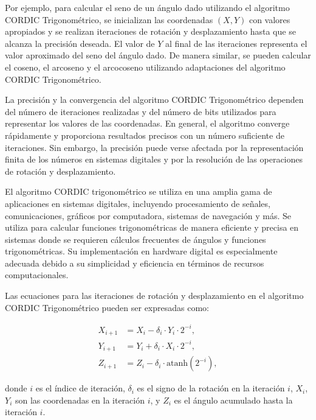 \documentclass[12pt,a4paper, twoside]{article} %
\begin{document}
Por ejemplo, para calcular el seno de un ángulo dado utilizando el algoritmo CORDIC Trigonométrico, se inicializan las coordenadas $(X, Y)$ con valores apropiados y se realizan iteraciones de rotación y desplazamiento hasta que se alcanza la precisión deseada. El valor de $Y$ al final de las iteraciones representa el valor aproximado del seno del ángulo dado. De manera similar, se pueden calcular el coseno, el arcoseno y el arcocoseno utilizando adaptaciones del algoritmo CORDIC Trigonométrico.



La precisión y la convergencia del algoritmo CORDIC Trigonométrico dependen del número de iteraciones realizadas y del número de bits utilizados para representar los valores de las coordenadas. En general, el algoritmo converge rápidamente y proporciona resultados precisos con un número suficiente de iteraciones. Sin embargo, la precisión puede verse afectada por la representación finita de los números en sistemas digitales y por la resolución de las operaciones de rotación y desplazamiento.

El algoritmo CORDIC trigonométrico se utiliza en una amplia gama de aplicaciones en sistemas digitales, incluyendo procesamiento de señales, comunicaciones, gráficos por computadora, sistemas de navegación y más. Se utiliza para calcular funciones trigonométricas de manera eficiente y precisa en sistemas donde se requieren cálculos frecuentes de ángulos y funciones trigonométricas. Su implementación en hardware digital es especialmente adecuada debido a su simplicidad y eficiencia en términos de recursos computacionales.

Las ecuaciones para las iteraciones de rotación y desplazamiento en el algoritmo CORDIC Trigonométrico pueden ser expresadas como:

\begin{equation}
    \begin{aligned}
        X_{i+1} &= X_i - \delta_i \cdot Y_i \cdot 2^{-i}, \\
        Y_{i+1} &= Y_i + \delta_i \cdot X_i \cdot 2^{-i}, \\
        Z_{i+1} &= Z_i - \delta_i \cdot \text{atanh}(2^{-i}),
    \end{aligned}
\end{equation}

donde $i$ es el índice de iteración, $\delta_i$ es el signo de la rotación en la iteración $i$, $X_i$, $Y_i$ son las coordenadas en la iteración $i$, y $Z_i$ es el ángulo acumulado hasta la iteración $i$.  
\end{document}
